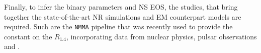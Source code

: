 Finally, to infer the binary parameters and \ac{NS} \ac{EOS}, the \mm{} studies, that 
bring together the state-of-the-art \ac{NR} simulations and \ac{EM} counterpart models are
required. Such are the \texttt{NMMA} pipeline \citep{Dietrich:2020efo} that was recently
used to provide the constant on the $R_{1.4}$, incorporating data from nuclear physics, 
pulsar observations and \GW{}.
%
%
%
%
%
